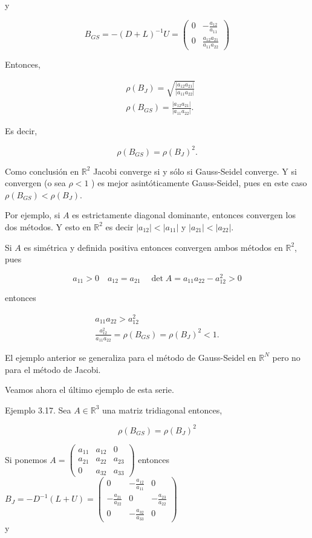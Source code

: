\documentclass[10pt]{article}
\begin{document}
y

$$
B_{G S}=-(D+L)^{-1} U=\left(\begin{array}{cc}
0 & -\frac{a_{12}}{a_{11}} \\
0 & \frac{a_{12} a_{21}}{a_{11} a_{22}}
\end{array}\right)
$$

Entonces,

$$
\begin{aligned}
& \rho\left(B_{J}\right)=\sqrt{\frac{\left|a_{12} a_{21}\right|}{\left|a_{11} a_{22}\right|}} \\
& \rho\left(B_{G S}\right)=\frac{\left|a_{12} a_{21}\right|}{\left|a_{11} a_{22}\right|} .
\end{aligned}
$$

Es decir,

$$
\rho\left(B_{G S}\right)=\rho\left(B_{J}\right)^{2} .
$$

Como conclusión en $\mathbb{R}^{2}$ Jacobi converge si y sólo si Gauss-Seidel converge. Y si convergen (o sea $\rho<1$ ) es mejor asintóticamente Gauss-Seidel, pues en este caso $\rho\left(B_{G S}\right)<\rho\left(B_{J}\right)$.

Por ejemplo, si $A$ es estrictamente diagonal dominante, entonces convergen los dos métodos. Y esto en $\mathbb{R}^{2}$ es decir $\left|a_{12}\right|<\left|a_{11}\right|$ y $\left|a_{21}\right|<\left|a_{22}\right|$.

Si $A$ es simétrica y definida positiva entonces convergen ambos métodos en $\mathbb{R}^{2}$, pues

$$
a_{11}>0 \quad a_{12}=a_{21} \quad \operatorname{det} A=a_{11} a_{22}-a_{12}^{2}>0
$$

entonces

$$
\begin{gathered}
a_{11} a_{22}>a_{12}^{2} \\
\frac{a_{12}^{2}}{a_{11} a_{22}}=\rho\left(B_{G S}\right)=\rho\left(B_{J}\right)^{2}<1 .
\end{gathered}
$$

El ejemplo anterior se generaliza para el método de Gauss-Seidel en $\mathbb{R}^{N}$ pero no para el método de Jacobi.

Veamos ahora el último ejemplo de esta serie.

Ejemplo 3.17. Sea $A \in \mathbb{R}^{3}$ una matriz tridiagonal entonces,

$$
\rho\left(B_{G S}\right)=\rho\left(B_{J}\right)^{2}
$$

Si ponemos $A=\left(\begin{array}{ccc}a_{11} & a_{12} & 0 \\ a_{21} & a_{22} & a_{23} \\ 0 & a_{32} & a_{33}\end{array}\right)$ entonces $B_{J}=-D^{-1}(L+U)=\left(\begin{array}{ccc}0 & -\frac{a_{12}}{a_{11}} & 0 \\ -\frac{a_{21}}{a_{22}} & 0 & -\frac{a_{23}}{a_{22}} \\ 0 & -\frac{a_{32}}{a_{33}} & 0\end{array}\right)$\\
y
\end{document}
